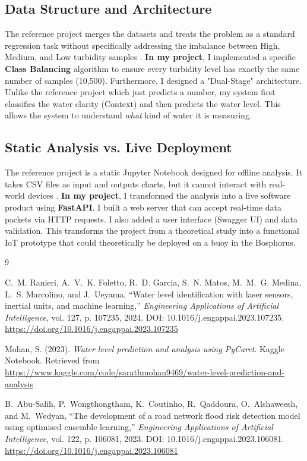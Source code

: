 \documentclass[12pt, a4paper]{article}
\begin{document}
\subsection{Data Structure and Architecture}
The reference project merges the datasets and treats the problem as a standard regression task without specifically addressing the imbalance between High, Medium, and Low turbidity samples \cite{mohan_kaggle}.
\textbf{In my project}, I implemented a specific \textbf{Class Balancing} algorithm to ensure every turbidity level has exactly the same number of samples (10,500). Furthermore, I designed a "Dual-Stage" architecture. Unlike the reference project which just predicts a number, my system first classifies the water clarity (Context) and then predicts the water level. This allows the system to understand \textit{what} kind of water it is measuring.

\subsection{Static Analysis vs. Live Deployment}
The reference project is a static Jupyter Notebook designed for offline analysis. It takes CSV files as input and outputs charts, but it cannot interact with real-world devices \cite{mohan_kaggle}.
\textbf{In my project}, I transformed the analysis into a live software product using \textbf{FastAPI}. I built a web server that can accept real-time data packets via HTTP requests. I also added a user interface (Swagger UI) and data validation. This transforms the project from a theoretical study into a functional IoT prototype that could theoretically be deployed on a buoy in the Bosphorus.

\newpage


\begin{thebibliography}{9}

C.~M. Ranieri, A.~V.~K. Foletto, R.~D. Garcia, S.~N. Matos, M.~M.~G. Medina, L.~S. Marcolino, and J.~Ueyama,
``Water level identification with laser sensors, inertial units, and machine learning,''
\textit{Engineering Applications of Artificial Intelligence}, vol. 127, p. 107235, 2024.
\newblock DOI: 10.1016/j.engappai.2023.107235.
\url{https://doi.org/10.1016/j.engappai.2023.107235}

Mohan, S. (2023). 
\textit{Water level prediction and analysis using PyCaret}. 
Kaggle Notebook. Retrieved from \url{https://www.kaggle.com/code/sarathmohan9469/water-level-prediction-and-analysis}

B.~Abu-Salih, P.~Wongthongtham, K.~Coutinho, R.~Qaddoura, O.~Alshaweesh, and M.~Wedyan,
``The development of a road network flood risk detection model using optimised ensemble learning,''
\textit{Engineering Applications of Artificial Intelligence}, vol. 122, p. 106081, 2023.
\newblock DOI: 10.1016/j.engappai.2023.106081.
\url{https://doi.org/10.1016/j.engappai.2023.106081}


\end{thebibliography}
\end{document}
